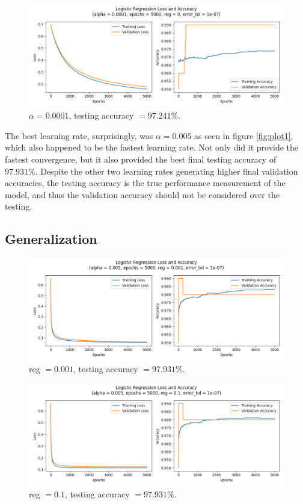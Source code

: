 \documentclass[letter]{article}
\begin{document}
\begin{figure}[H]
	\centering
	\includegraphics[width=\linewidth]{Figure_3}
	\caption{$\alpha = 0.0001$, testing accuracy $ = 97.241\%$.}
	\label{fig:plot3}
\end{figure}

The best learning rate, surprisingly, was $\alpha = 0.005$ as seen in figure \ref{fig:plot1}, which also happened to be the fastest learning rate. Not only did it provide the fastest convergence, but it also provided the best final testing accuracy of $97.931\%$. Despite the other two learning rates generating higher final validation accuracies, the testing accuracy is the true performance measurement of the model, and thus the validation accuracy should not be considered over the testing. 

\subsection{Generalization}

\begin{figure}[H]
	\centering
	\includegraphics[width=\linewidth]{Figure_4}
	\caption{reg $ = 0.001$, testing accuracy $ = 97.931\%$.}
	\label{fig:plot4}
\end{figure}

\begin{figure}[H]
	\centering
	\includegraphics[width=\linewidth]{Figure_5}
	\caption{reg $ = 0.1$, testing accuracy $ = 97.931\%$.}
	\label{fig:plot5}
\end{figure}
\end{document}
